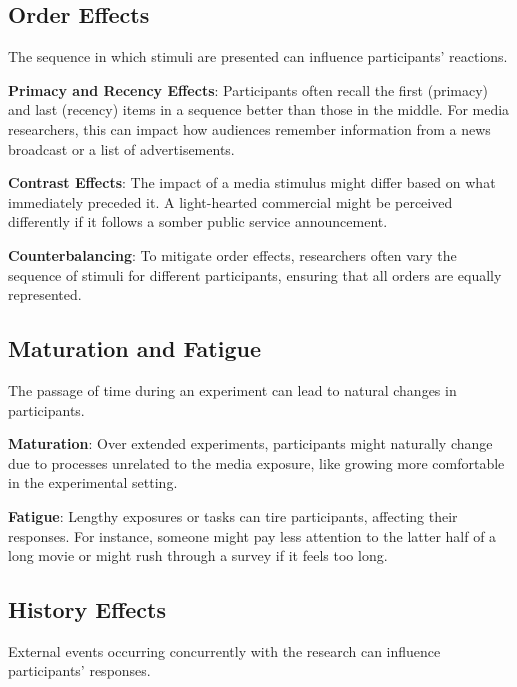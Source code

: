 \documentclass[
  b5paper]{book}
\begin{document}
\hypertarget{order-effects}{%
\subsection*{Order Effects}\label{order-effects}}

The sequence in which stimuli are presented can influence participants' reactions.

\textbf{Primacy and Recency Effects}: Participants often recall the first (primacy) and last (recency) items in a sequence better than those in the middle. For media researchers, this can impact how audiences remember information from a news broadcast or a list of advertisements.

\textbf{Contrast Effects}: The impact of a media stimulus might differ based on what immediately preceded it. A light-hearted commercial might be perceived differently if it follows a somber public service announcement.

\textbf{Counterbalancing}: To mitigate order effects, researchers often vary the sequence of stimuli for different participants, ensuring that all orders are equally represented.

\hypertarget{maturation-and-fatigue}{%
\subsection*{Maturation and Fatigue}\label{maturation-and-fatigue}}

The passage of time during an experiment can lead to natural changes in participants.

\textbf{Maturation}: Over extended experiments, participants might naturally change due to processes unrelated to the media exposure, like growing more comfortable in the experimental setting.

\textbf{Fatigue}: Lengthy exposures or tasks can tire participants, affecting their responses. For instance, someone might pay less attention to the latter half of a long movie or might rush through a survey if it feels too long.

\hypertarget{history-effects}{%
\subsection*{History Effects}\label{history-effects}}

External events occurring concurrently with the research can influence participants' responses.
\end{document}
